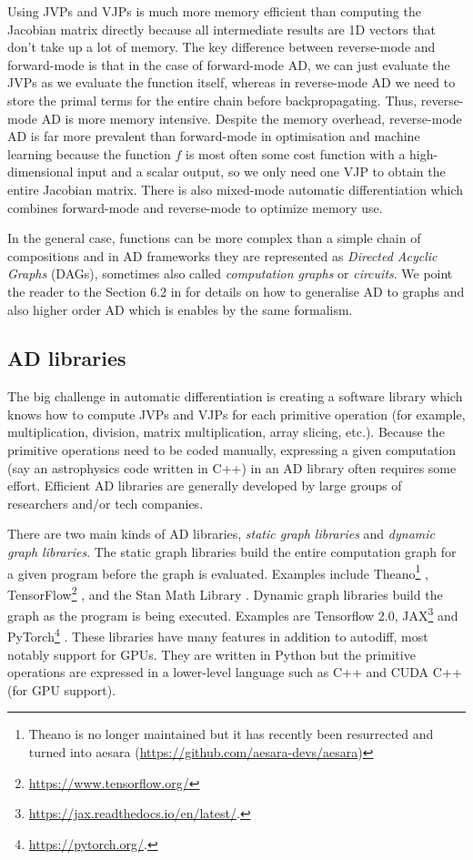\documentclass[12pt,dvipsnames]{report}
\newcommand{\ssf}[1]{\textsf{#1}}
\begin{document}
Using JVPs and VJPs is much more memory efficient than computing the Jacobian matrix directly 
because all intermediate results are 1D vectors that 
don't take up a lot of memory. The key difference between reverse-mode and  forward-mode is that 
in the case of forward-mode AD, we can just evaluate the JVPs as we evaluate the function itself,
whereas in reverse-mode AD we need to store the primal terms for the entire chain before 
backpropagating. Thus, reverse-mode AD is more memory intensive.
Despite the memory overhead, reverse-mode AD is far more prevalent than forward-mode in 
optimisation and machine learning 
because the function $f$ is most often some cost function with a high-dimensional input and a scalar 
output, so we only need one VJP to obtain the entire Jacobian matrix. There is also mixed-mode 
automatic differentiation which combines forward-mode and reverse-mode to optimize memory use.

In the general case, functions can be more complex than a simple chain of compositions and in AD 
frameworks they are represented as \emph{Directed Acyclic Graphs} (DAGs), sometimes also 
called \emph{computation graphs} or \emph{circuits}. We point the reader to the Section 
6.2 in \citep{murphy_book_2023} for details on how to generalise AD to graphs and also higher 
order AD which is enables by the same formalism. 

\subsection{AD libraries}
\label{ssec:ad_libraries}
The big challenge in automatic differentiation is creating a software library which knows 
how to compute JVPs and VJPs for each primitive operation (for example, multiplication, division, 
matrix multiplication, array slicing, etc.).
Because the primitive operations need to be coded 
manually, expressing a given computation (say an astrophysics code written in \ssf{C++}) in 
an AD library often requires some effort.
Efficient AD libraries are generally developed by large groups of researchers and/or tech 
companies.

There are two main kinds of AD libraries, \emph{static graph libraries} and 
\emph{dynamic graph libraries}.
The static graph libraries build the entire computation graph for a given program before 
the graph is evaluated. Examples include \ssf{Theano}\footnote{Theano is no longer 
maintained but it has recently been resurrected and turned into \ssf{aesara} 
(\url{https://github.com/aesara-devs/aesara})} \citep{arXiv:1605.02688}, 
\ssf{TensorFlow}\footnote{\url{https://www.tensorflow.org/}} \citep{arXiv:1603.04467}, 
and the \ssf{Stan Math Library} \citep{arXiv:1509.07164}.
Dynamic graph libraries build the graph as the program is being executed. Examples are 
\ssf{Tensorflow 2.0}, \ssf{JAX}\footnote{\url{https://jax.readthedocs.io/en/latest/}.} 
 and \ssf{PyTorch}\footnote{\url{https://pytorch.org/}.} \citep{pytorch}.
These libraries have many features in addition to autodiff, most notably support for
GPUs. They are written in Python but the primitive operations are 
expressed in a lower-level language such as \ssf{C++} and \ssf{CUDA C++} 
(for GPU support). 
\end{document}
